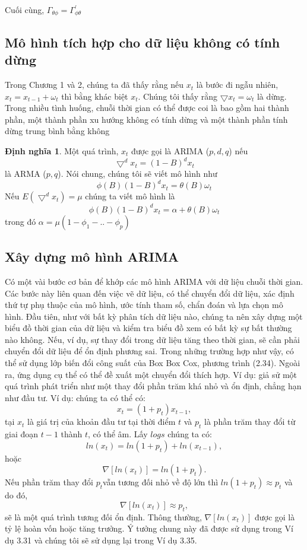 \documentclass[12pt, a4paper,oneside]{book}
\theoremstyle{definition}
\newtheorem{dn}[theo]{Định nghĩa}
\begin{document}
Cuối cùng, $ \Gamma_{\theta\phi}= \Gamma_{\phi\theta}^{\prime}$
\subsection{Mô hình tích hợp cho dữ liệu không có tính dừng}
	Trong Chương 1 và 2, chúng ta đã thấy rằng nếu $ x_{t} $ là bước đi ngẫu nhiên, $ x_{t}=x_{t-1}+\omega_{t} $ thì bằng khác biệt $ x_{t} $. Chúng tôi thấy rằng $ \bigtriangledown x_{t}=\omega_{t} $ là dừng. Trong nhiều tình huống, chuỗi thời gian có thể được coi là bao gồm hai thành phần, một thành phần xu hướng không có tính dừng và một thành phần tính dừng trung bình bằng không
\begin{dn}
	Một quá trình, $ x_{t} $ được gọi là ARIMA ($ p, d, q $) nếu 
	$$ \bigtriangledown^{d} x_{t}=(1-B)^{d}x_{t}$$
	là ARMA ($ p, q $). Nói chung, chúng tôi sẽ viết mô hình như 
	$$ \phi(B)(1-B)^{d}x_{t}=\theta(B)\omega_{t} $$
	Nếu $ E(\bigtriangledown^{d} x_{t})=\mu $ chúng ta viết mô hình là
	$$ \phi(B)(1-B)^{d}x_{t}=\alpha+\theta(B)\omega_{t} $$
	trong đó $ \alpha=\mu(1-\phi_{1}-..-\phi_{p}) $
\end{dn}
\subsection{Xây dựng mô hình ARIMA}
Có một vài bước cơ bản để khớp các mô hình ARIMA với dữ liệu chuỗi thời gian. Các bước này liên quan đến việc vẽ dữ liệu, có thể chuyển đổi dữ liệu, xác định thứ tự phụ thuộc của mô hình, ước tính tham số, chẩn đoán và lựa chọn mô hình. Đầu tiên, như với bất kỳ phân tích dữ liệu nào, chúng ta nên xây dựng một biểu đồ thời gian của dữ liệu và kiểm tra biểu đồ xem có bất kỳ sự bất thường nào không. Nếu, ví dụ, sự thay đổi trong dữ liệu tăng theo thời gian, sẽ cần phải chuyển đổi dữ liệu để ổn định phương sai. Trong những trường hợp như vậy, có thể sử dụng lớp biến đổi công suất của Box Box Cox, phương trình (2.34). Ngoài ra, ứng dụng cụ thể có thể đề xuất một chuyển đổi thích hợp. Ví dụ: giả sử một quá trình phát triển như một thay đổi phần trăm khá nhỏ và ổn định, chẳng hạn như đầu tư. Ví dụ: chúng ta có thể có:
$$x_{t}=(1+p_{t})x_{t-1},$$
tại $x_{t}$ là giá trị của khoản đầu tư tại thời điểm $t$ và $p_{t}$ là phần trăm thay đổi từ giai đoạn $t - 1$ thành $t$, có thể âm. Lấy $logs$ chúng ta có: 
$$ln(x_{t})= ln(1+p_{t}) + ln(x_{t-1}),$$
hoặc
$$\nabla[ln(x_{t})]= ln(1+p_{t}).$$
Nếu phần trăm thay đổi $p_{t}$vẫn tương đối nhỏ về độ lớn thì $ln(1+p_{t})\approx p_{t}$ và do đó, $$\nabla[ln(x_{t})]\approx p_{t},$$
sẽ là một quá trình tương đối ổn định. Thông thường, $\nabla[ln(x_{t})]$ được gọi là tỷ lệ hoàn vốn hoặc tăng trưởng. Ý tưởng chung này đã được sử dụng trong Ví dụ 3.31 và chúng tôi sẽ sử dụng lại trong Ví dụ 3.35.
\end{document}
